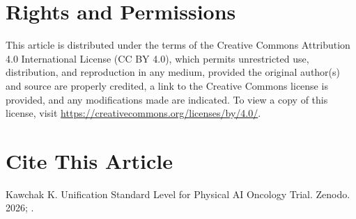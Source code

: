 \section*{Rights and Permissions}
This article is distributed under the terms of the Creative Commons Attribution 4.0 International License (CC BY 4.0), which permits unrestricted use, distribution, and reproduction in any medium, provided the original author(s) and source are properly credited, a link to the Creative Commons license is provided, and any modifications made are indicated. To view a copy of this license, visit \url{https://creativecommons.org/licenses/by/4.0/}.

\section*{Cite This Article}
Kawchak K. Unification Standard Level for Physical AI Oncology Trial. Zenodo. 2026; .


